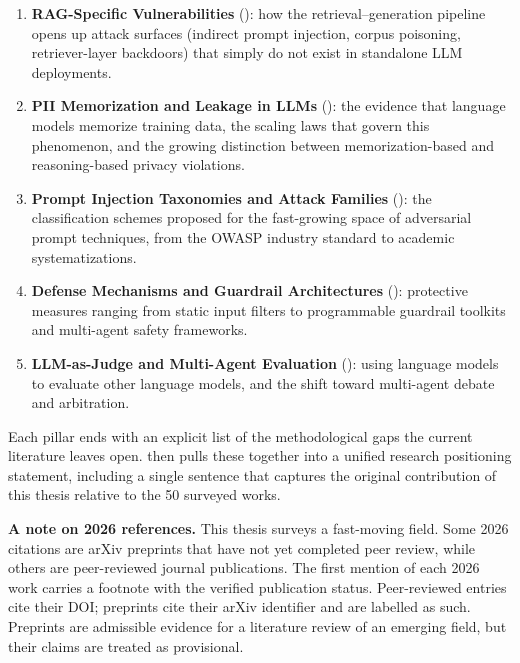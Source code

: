 \documentclass[12pt, a4paper]{report}
\begin{document}
\begin{enumerate}[leftmargin=2em, itemsep=3pt]
  \item \textbf{RAG-Specific Vulnerabilities} (): how the retrieval--generation pipeline opens up attack surfaces (indirect prompt injection, corpus poisoning, retriever-layer backdoors) that simply do not exist in standalone LLM deployments.
  \item \textbf{PII Memorization and Leakage in LLMs} (): the evidence that language models memorize training data, the scaling laws that govern this phenomenon, and the growing distinction between memorization-based and reasoning-based privacy violations.
  \item \textbf{Prompt Injection Taxonomies and Attack Families} (): the classification schemes proposed for the fast-growing space of adversarial prompt techniques, from the OWASP industry standard to academic systematizations.
  \item \textbf{Defense Mechanisms and Guardrail Architectures} (): protective measures ranging from static input filters to programmable guardrail toolkits and multi-agent safety frameworks.
  \item \textbf{LLM-as-Judge and Multi-Agent Evaluation} (): using language models to evaluate other language models, and the shift toward multi-agent debate and arbitration.
\end{enumerate}

Each pillar ends with an explicit list of the methodological gaps the current literature leaves open.  then pulls these together into a unified research positioning statement, including a single sentence that captures the original contribution of this thesis relative to the 50 surveyed works.

\begin{notebox}
\textbf{A note on 2026 references.} This thesis surveys a fast-moving field. Some 2026 citations are arXiv preprints that have not yet completed peer review, while others are peer-reviewed journal publications. The first mention of each 2026 work carries a footnote with the verified publication status. Peer-reviewed entries cite their DOI; preprints cite their arXiv identifier and are labelled as such. Preprints are admissible evidence for a literature review of an emerging field, but their claims are treated as provisional.
\end{notebox}
\end{document}
